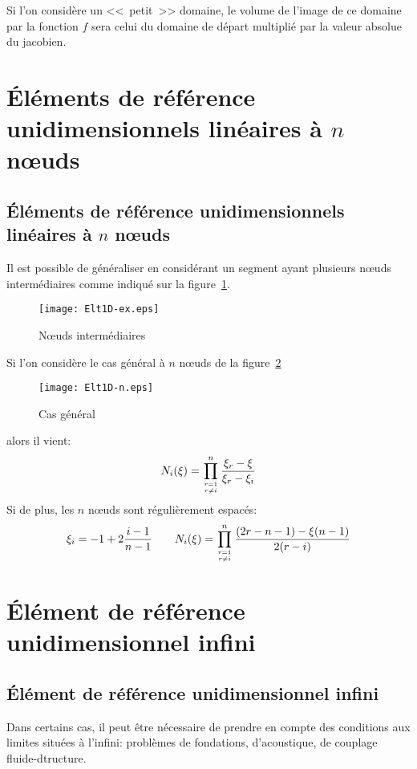 \medskip
Si l'on considère un <<~petit~>> domaine, le volume de l'image de ce domaine par la fonction $f$ 
sera celui du domaine de départ multiplié par la valeur absolue du jacobien.




\medskip
\ifVersionAvecExemplesSepares
   \section{Éléments de référence unidimensionnels linéaires à $n$ nœuds}
\else
   \subsection{Éléments de référence unidimensionnels linéaires à $n$ nœuds}
\fi

Il est possible de généraliser en considérant un segment ayant plusieurs nœuds 
intermédiaires comme indiqué sur la figure~\ref{fig:ex2:noeudint}.
\begin{figure}[ht]\centering
\texttt{[image: Elt1D-ex.eps]}
\caption{Nœuds  intermédiaires}\label{fig:ex2:noeudint}
\end{figure}
\medskip
Si l'on considère le cas général à $n$ nœuds de la figure~\ref{fig:ex2:casgen}
\begin{figure}[ht]\centering
\texttt{[image: Elt1D-n.eps]}
\caption{Cas général}\label{fig:ex2:casgen}
\end{figure}
alors il vient:
\begin{equation} N_i(\xi) = \prod_{r=1\atop r\ne i}^n \dfrac{\xi_r-\xi}{\xi_r-\xi_i} \end{equation}
\medskip
Si de plus, les $n$ nœuds sont régulièrement espacés:
\begin{equation}\xi_i = -1+2\frac{i-1}{n-1} \qquad
N_i(\xi) = \prod_{r=1\atop r\ne i}^n \dfrac{(2r-n-1)-\xi(n-1)}{2(r-i)} \end{equation}

\medskip
\ifVersionAvecExemplesSepares
   \section{Élément de référence unidimensionnel infini}
\else
   \subsection{Élément de référence unidimensionnel infini}
\fi

Dans certains cas, il peut être nécessaire de prendre en compte des conditions aux limites situées à
l'infini: problèmes de fondations, d'acoustique, de couplage fluide-dtructure.

